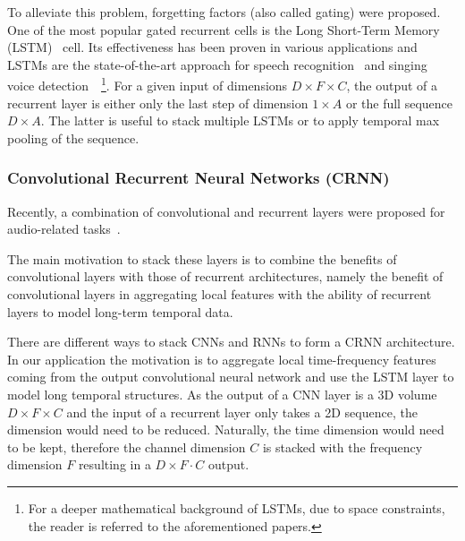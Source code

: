 To alleviate this problem, forgetting factors (also called gating) were proposed.
One of the most popular gated recurrent cells is the Long Short-Term Memory (LSTM)~\cite{Hochreiter97} cell.
Its effectiveness has been proven in various applications and LSTMs are the state-of-the-art approach for speech recognition~\cite{Graves13} and singing voice detection~\cite{Leglaive15}~\footnote{For a deeper mathematical background of LSTMs, due to space constraints, the reader is referred to the aforementioned papers.}.
For a given input of dimensions \(D \times F \times C\), the output of a recurrent layer is either only the last step of dimension \(1 \times A\) or the full sequence \(D \times A\).
The latter is useful to stack multiple LSTMs or to apply temporal max pooling of the sequence.

\subsubsection{Convolutional Recurrent Neural Networks (CRNN)}%
Recently, a combination of convolutional and recurrent layers were proposed for audio-related tasks~\cite{sainath15, amodei16, Choi17, cakir17}.

The main motivation to stack these layers is to combine the benefits of convolutional layers with those of recurrent architectures, namely the benefit of convolutional layers in aggregating local features with the ability of recurrent layers to model long-term temporal data.

There are different ways to stack CNNs and RNNs to form a CRNN architecture.
In our application the motivation is to aggregate local time-frequency features coming from the output convolutional neural network and use the LSTM layer to model long temporal structures.
As the output of a CNN layer is a 3D volume \(D \times F \times C\) and the input of a recurrent layer only takes a 2D sequence, the dimension would need to be reduced. Naturally, the time dimension would need to be kept, therefore the channel dimension \(C\) is stacked with the frequency dimension \(F\) resulting in a \(D \times F \cdot C\) output.

